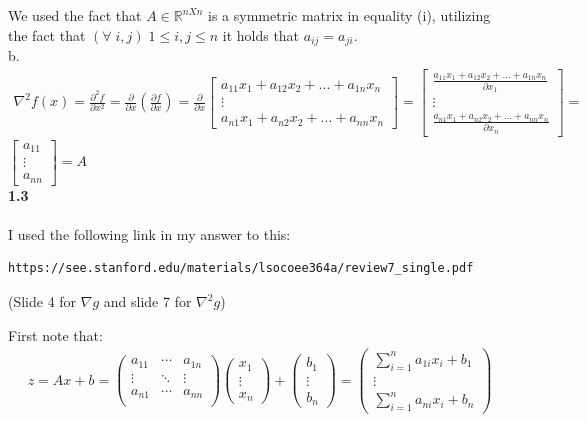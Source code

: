 \documentclass[fleqn]{article}
\begin{document}
We used the fact that $A \in \mathbb{R}^{nXn}$ is a symmetric matrix in equality (i), utilizing the fact that $(\forall \; i,j) \; 1 \leq i,j \leq n $ it holds that $a_{ij} = a_{ji}$. \\


b. \\
\begin{align*}
\nabla^2 f(x) = \frac{\partial^2 f}{\partial x^2}
=
\frac{\partial}{\partial x} \left( \frac{\partial f}{\partial x}\right)
=
\frac{\partial}{\partial x}
\begin{bmatrix}
	a_{11}x_1 + a_{12}x_2 + ... + a_{1n}x_n \\
	\vdots                                     \\
	a_{n1}x_1 + a_{n2}x_2 + ... + a_{nn}x_n
\end{bmatrix}
=
\begin{bmatrix}
	\frac{a_{11}x_1 + a_{12}x_2 + ... + a_{1n}x_n}{\partial x_1} \\
	\vdots                                     \\
	\frac{a_{n1}x_1 + a_{n2}x_2 + ... + a_{nn}x_n}{\partial x_n}
\end{bmatrix} =
\end{align*}
$ \begin{bmatrix} a_{11} \\	\vdots  \\	a_{nn}  \end{bmatrix} = A $ \\

\textbf{1.3} \\ \\
I used the following link in my answer to this: 
\begin{verbatim}
https://see.stanford.edu/materials/lsocoee364a/review7_single.pdf
\end{verbatim}
(Slide 4 for $\nabla g$ and slide 7 for $\nabla^2g$)

First note that:
\begin{align*}
z=Ax+b = \begin{pmatrix}
a_{11} & \cdots & a_{1n}  \\
\vdots & \ddots & \vdots  \\
a_{n1} & \cdots & a_{nn}  \\
        \end{pmatrix}
\begin{pmatrix} x_1 \\ \vdots \\ x_n  \end{pmatrix} +
\begin{pmatrix} b_1 \\ \vdots \\ b_n  \end{pmatrix} 
=
\begin{pmatrix}
\sum_{i=1}^{n} a_{1i}x_i +b_1 \\  \vdots \\  \sum_{i=1}^{n} a_{ni}x_i +b_n
\end{pmatrix} 
\end{align*} \\
\end{document}
